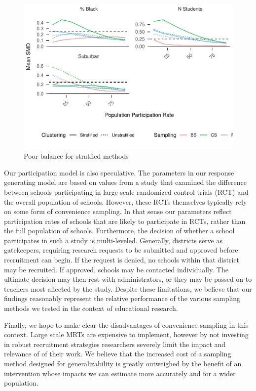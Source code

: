 \documentclass[man,floatsintext]{apa6}
\begin{document}
\begin{figure}
\centering
\includegraphics{GenSamp-Paper_files/figure-latex/fig-SMD-by-Var-bad-1.pdf}
\caption{\label{fig:fig-SMD-by-Var-bad}Poor balance for stratfied methods}
\end{figure}

Our participation model is also speculative. The parameters in our response generating model are based on values from a study that examined the difference between schools participating in large-scale randomized control trials (RCT) and the overall population of schools. However, these RCTs themselves typically rely on some form of convenience sampling. In that sense our parameters reflect participation rates of schools that are likely to participate in RCTs, rather than the full population of schools. Furthermore, the decision of whether a school participates in such a study is multi-leveled. Generally, districts serve as gatekeepers, requiring research requests to be submitted and approved before recruitment can begin. If the request is denied, no schools within that district may be recruited. If approved, schools may be contacted individually. The ultimate decision may then rest with administrators, or they may be passed on to teachers most affected by the study. Despite these limitations, we believe that our findings reasonably represent the relative performance of the various sampling methods we tested in the context of educational research.

Finally, we hope to make clear the disadvantages of convenience sampling in this context. Large scale MRTs are expensive to implement, however by not investing in robust recruitment strategies researchers severely limit the impact and relevance of of their work. We believe that the increased cost of a sampling method designed for generalizability is greatly outweighed by the benefit of an intervention whose impacts we can estimate more accurately and for a wider population.
\end{document}
